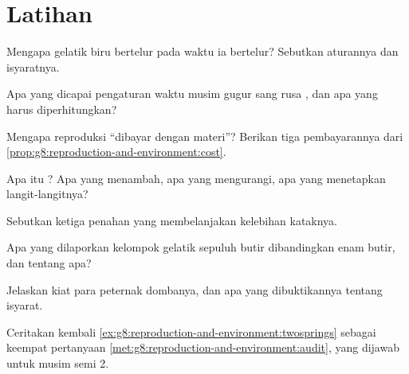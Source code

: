 \section{Latihan}

\begin{exercise}[$\star$]\label{exo:g8:reproduction-and-environment:1}
Mengapa gelatik biru bertelur pada waktu ia bertelur? Sebutkan
aturannya dan isyaratnya.
\end{exercise}

\begin{exercise}[$\star$]\label{exo:g8:reproduction-and-environment:2}
Apa yang dicapai pengaturan waktu musim gugur sang rusa , dan
apa yang harus diperhitungkan?
\end{exercise}

\begin{exercise}[$\star$]\label{exo:g8:reproduction-and-environment:3}
Mengapa reproduksi ``dibayar dengan materi''? Berikan tiga
pembayarannya dari
\cref{prop:g8:reproduction-and-environment:cost}.
\end{exercise}

\begin{exercise}[$\star$]\label{exo:g8:reproduction-and-environment:4}
Apa itu ? Apa yang menambah, apa yang mengurangi, apa yang
menetapkan langit-langitnya?
\end{exercise}

\begin{exercise}[$\star$]\label{exo:g8:reproduction-and-environment:5}
Sebutkan ketiga penahan yang membelanjakan kelebihan kataknya.
\end{exercise}

\begin{exercise}[$\star$]\label{exo:g8:reproduction-and-environment:6}
Apa yang dilaporkan kelompok  gelatik sepuluh butir dibandingkan
enam butir, dan tentang apa?
\end{exercise}

\begin{exercise}[$\star\star$]\label{exo:g8:reproduction-and-environment:7}
Jelaskan kiat  para peternak dombanya, dan apa yang
dibuktikannya tentang isyarat.
\end{exercise}

\begin{exercise}[$\star\star$]\label{exo:g8:reproduction-and-environment:8}
Ceritakan kembali \cref{ex:g8:reproduction-and-environment:twosprings}
sebagai keempat pertanyaan
\cref{met:g8:reproduction-and-environment:audit}, yang dijawab untuk
musim semi 2.
\end{exercise}

